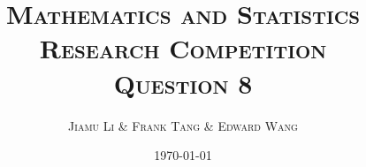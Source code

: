\usepackage{mathtools}
\usepackage{amssymb}
\usepackage{amsthm}
\usepackage{parskip}

\usepackage[p]{ETbb}
\usepackage[scaled=.95, type1]{cabin}
\usepackage[T1]{fontenc}
\usepackage[libertine, vvarbb]{newtxmath}
\usepackage{microtype}
\usepackage[bf, sc]{titlesec}

\usepackage{caption}
\usepackage{float}
\usepackage{booktabs}
\usepackage{minted}
\usepackage{FiraMono}
\usepackage[usenames, svgnames, dvipsnames, table]{xcolor}
\usepackage{hyperref}

\usepackage[inline]{asymptote}
\def\asydir{asy}

\usepackage{fancyhdr}
\pagestyle{fancy}
\fancyhf{}
\setlength{\headheight}{25pt}
\fancyhead[R]{\scshape \nouppercase{\leftmark}}
\fancyfoot[C]{\thepage}
\renewcommand{\footrulewidth}{1pt}
\fancypagestyle{plain}{
  \renewcommand{\headrulewidth}{0pt}
  \renewcommand{\footrulewidth}{0pt}
  \fancyhf{}
}

\newtheorem{theorem}{\scshape Theorem}
\newtheorem{problem}{\scshape Question}
\newtheorem{claim}{\scshape Claim}[theorem]
\DeclareMathOperator{\prob}{Pr}

\title{\scshape {\Huge Mathematics and Statistics Research Competition} \\[1em] Question 8}

\author{\scshape Jiamu Li \& Frank Tang \& Edward Wang}

\date{\scshape \today}

